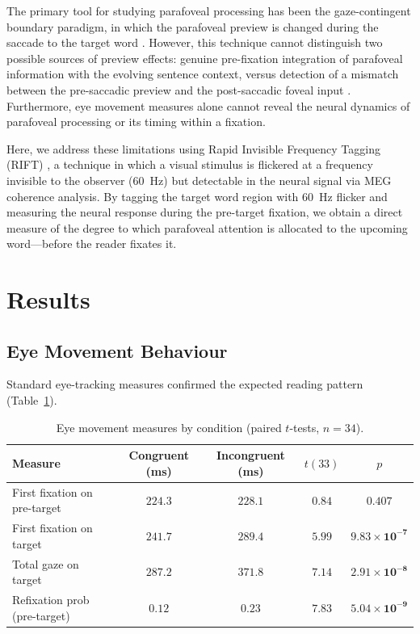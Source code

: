 \documentclass[11pt]{article}
\begin{document}
The primary tool for studying parafoveal processing has been the gaze-contingent boundary paradigm, in which the parafoveal preview is changed during the saccade to the target word \citep{rayner1975parafoveal}. However, this technique cannot distinguish two possible sources of preview effects: genuine pre-fixation integration of parafoveal information with the evolving sentence context, versus detection of a mismatch between the pre-saccadic preview and the post-saccadic foveal input \citep{schotter2015does, snell2017integration}. Furthermore, eye movement measures alone cannot reveal the neural dynamics of parafoveal processing or its timing within a fixation.

Here, we address these limitations using Rapid Invisible Frequency Tagging (RIFT) \citep{zhigalov2019rift, lozanosoldevilla2024rift}, a technique in which a visual stimulus is flickered at a frequency invisible to the observer (60~Hz) but detectable in the neural signal via MEG coherence analysis. By tagging the target word region with 60~Hz flicker and measuring the neural response during the pre-target fixation, we obtain a direct measure of the degree to which parafoveal attention is allocated to the upcoming word---before the reader fixates it.

\section{Results}

\subsection{Eye Movement Behaviour}

Standard eye-tracking measures confirmed the expected reading pattern (Table~\ref{tab:eyemove}).

\begin{table}[H]
\centering
\caption{Eye movement measures by condition (paired $t$-tests, $n = 34$).}
\label{tab:eyemove}
\begin{tabular}{@{}lcccc@{}}
\toprule
Measure & Congruent (ms) & Incongruent (ms) & $t(33)$ & $p$ \\
\midrule
First fixation on pre-target & $224.3$ & $228.1$ & $0.84$ & $0.407$ \\
First fixation on target & $241.7$ & $289.4$ & $5.99$ & $\mathbf{9.83 \times 10^{-7}}$ \\
Total gaze on target & $287.2$ & $371.8$ & $7.14$ & $\mathbf{2.91 \times 10^{-8}}$ \\
Refixation prob (pre-target) & $0.12$ & $0.23$ & $7.83$ & $\mathbf{5.04 \times 10^{-9}}$ \\
\bottomrule
\end{tabular}
\end{table}
\end{document}
